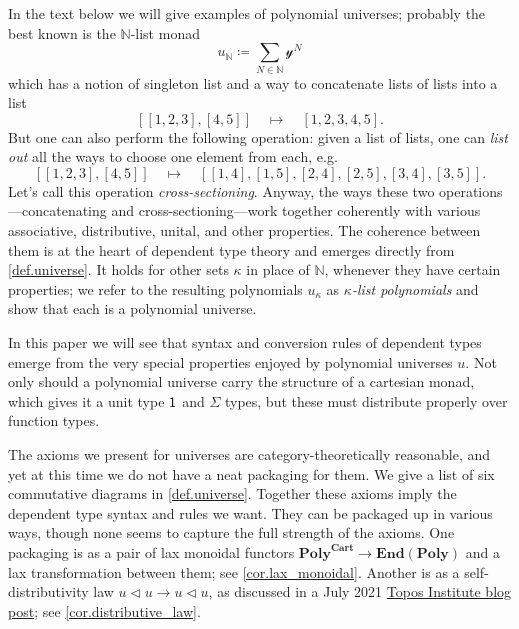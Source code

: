 \documentclass[11pt, one side, article]{memoir}
\theoremstyle{definition}
\theoremstyle{plain}
\newcommand{\Cat}[1]{\mathbf{#1}}%
\newcommand{\nn}{\mathbb{N}}
\newcommand{\en}{\Cat{End}}
\newcommand{\yon}{\mathcal{y}}
\newcommand{\poly}{\Cat{Poly}}
\newcommand{\polycart}{\poly^{\Cat{Cart}}}
\newcommand{\0}{\textsf{0}}
\newcommand{\1}{\tn{\textsf{1}}}
\newcommand{\tri}{\mathbin{\triangleleft}}
\begin{document}
In the text below we will give examples of polynomial universes; probably the best known is the $\nn$-list monad
\[
	u_\nn\coloneqq\sum_{N\in\nn}\yon^N
\]
which has a notion of singleton list and a way to concatenate lists of lists into a list
\[[[1,2,3],[4,5]]\quad\mapsto\quad [1,2,3,4,5].\]
But one can also perform the following operation: given a list of lists, one can \emph{list out} all the ways to choose one element from each, e.g.
\[
[[1,2,3],[4,5]]\quad\mapsto\quad [[1,4],[1,5],[2,4],[2,5],[3,4],[3,5]].
\]
Let's call this operation \emph{cross-sectioning}. Anyway, the ways these two operations---concatenating and cross-sectioning---work together coherently with various associative, distributive, unital, and other properties. The coherence between them is at the heart of dependent type theory and emerges directly from \cref{def.universe}. It holds for other sets $\kappa$ in place of $\nn$, whenever they have certain properties; we refer to the resulting polynomials $u_\kappa$ as \emph{$\kappa$-list polynomials} and show that each is a polynomial universe.

In this paper we will see that syntax and conversion rules of dependent types  emerge from the very special properties enjoyed by polynomial universes $u$. Not only should a polynomial universe carry the structure of a cartesian monad, which gives it a unit type $\1$ and $\Sigma$ types, but these must distribute properly over function types. 

The axioms we present for universes are category-theoretically reasonable, and yet at this time we do not have a neat packaging for them. We give a list of six commutative diagrams in \cref{def.universe}. Together these axioms imply the dependent type syntax and rules we want. They can be packaged up in various ways, though none seems to capture the full strength of the axioms. One packaging is as a pair of lax monoidal functors $\polycart\to\en(\poly)$ and a lax transformation between them; see \cref{cor.lax_monoidal}. Another is as a self-distributivity law $u\tri u\to u\tri u$, as discussed in a July 2021 \href{https://topos.site/blog/2021/07/jump-monads-from-conjugation-to-dependent-types/}{Topos Institute blog post}; see \cref{cor.distributive_law}.
\end{document}
